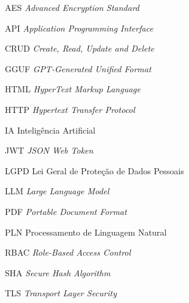 \documentclass[
	12pt,				%
	oneside,          %
	a4paper,			%
	chapter=TITLE,		%
	section=TITLE,		%
	subsection=TITLE,	%
	english,			%
	brazil			%
	,sumario=tradicional,
	]{abntex2-IFC}
\begin{document}
\frenchspacing 


\imprimircapa

\imprimirfolhaderosto



% 





% 



\listoffigures*
\cleardoublepage



\begin{siglas}
  \item[AES] \textit{Advanced Encryption Standard}
  \item[API] \textit{Application Programming Interface}
  \item[CRUD] \textit{Create, Read, Update and Delete}
  \item[GGUF] \textit{GPT-Generated Unified Format}
  \item[HTML] \textit{HyperText Markup Language}
  \item[HTTP] \textit{Hypertext Transfer Protocol}
  \item[IA] Inteligência Artificial
  \item[JWT] \textit{JSON Web Token}
  \item[LGPD] Lei Geral de Proteção de Dados Pessoais
  \item[LLM] \textit{Large Language Model}
  \item[PDF] \textit{Portable Document Format}
  \item[PLN] Processamento de Linguagem Natural
  \item[RBAC] \textit{Role-Based Access Control}
  \item[SHA] \textit{Secure Hash Algorithm}
  \item[TLS] \textit{Transport Layer Security}
\end{siglas}
\end{document}
